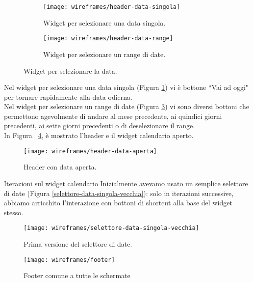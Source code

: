 \documentclass[../../../main.tex]{subfiles}
\begin{document}
\begin{figure}[H]
    \begin{subfigure}[b]{0.5\textwidth}
        \centering
        \texttt{[image: wireframes/header-data-singola]}
        \caption{Widget per selezionare una data singola.}
        \label{fig:header-data-singola}
    \end{subfigure}
\hfill
    \begin{subfigure}[b]{0.5\textwidth}
        \centering
        \texttt{[image: wireframes/header-data-range]}
        \caption{Widget per selezionare un range di date.}
        \label{fig:header-data-range}
    \end{subfigure}
    \caption{Widget per selezionare la data.}
\end{figure}


Nel widget per selezionare una data singola (Figura \ref{fig:header-data-singola}) vi è bottone ``Vai ad oggi" per tornare rapidamente alla data odierna.\\
Nel widget per selezionare un range di date (Figura \ref{fig:header-data-range}) vi sono diversi bottoni che permettono agevolmente di andare al mese precedente, ai quindici giorni precedenti, ai sette giorni precedenti o di deselezionare il range.\\
In Figura ~\ref{fig:header-data-aperta}, è mostrato l'header e il widget calendario aperto.

\begin{figure}[H]
    \centering
    \texttt{[image: wireframes/header-data-aperta]}
    \caption{Header con data aperta.}\label{fig:header-data-aperta}
\end{figure}

\begin{bclogo}{Iterazioni sul widget calendario}
    Inizialmente avevamo usato un semplice selettore di date (Figura \ref{selettore-data-singola-vecchia}): solo in iterazioni successive, abbiamo arricchito l'interazione con bottoni di shortcut alla base del widget stesso.
\begin{figure}[H]
    \centering
    \texttt{[image: wireframes/selettore-data-singola-vecchia]}
    \caption{Prima versione del selettore di date.}\label{fig:selettore-data-singola-vecchia}
\end{figure}
\end{bclogo}

\begin{figure}[H]
    \centering
    \texttt{[image: wireframes/footer]}
    \caption{Footer comune a tutte le schermate}
    \label{fig:footer}
\end{figure}
\end{document}
